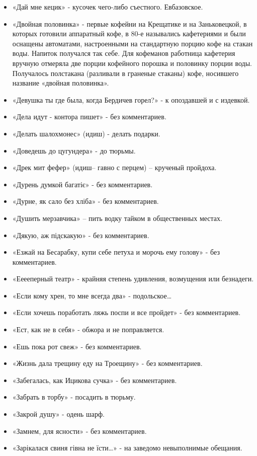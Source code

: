 \begin{itemize}
\item  «Дай мне кецик» - кусочек чего-либо съестного. Евбазовское.
\item  «Двойная половинка» - первые кофейни на Крещатике и на Заньковецкой, в которых готовили аппаратный кофе, в 80-е назывались кафетериями и были оснащены автоматами, настроенными на стандартную порцию кофе на стакан воды. Напиток получался так себе. Для кофеманов работница кафетерия вручную отмеряла две порции кофейного порошка и половинку порции воды. Получалось полстакана (разливали в граненые стаканы) кофе, носившего название «двойная половинка».
\item  «Девушка ты где была, когда Бердичев горел?» - к опоздавшей и с издевкой.
\item  «Дела идут - контора пишет» - без комментариев.
\item  «Делать шалохмонес» (идиш) - делать подарки.
\item  «Доведешь до цугундера» - до тюрьмы.
\item  «Дрек мит фефер» (идиш– гавно с перцем) – крученый пройдоха. 
\item  «Дурень думкой багатіє» - без комментариев.
\item  «Дурне, як сало без хліба» - без комментариев.
\item  «Душить мерзавчика» – пить водку тайком в общественных местах.
\item  «Дякую, аж підскакую» - без комментариев.
\item  «Езжай на Бесарабку, купи себе петуха и морочь ему голову» - без комментариев.
\item  «Ееееперный театр» - крайняя степень удивления, возмущения или безнадеги.
\item  «Если кому хрен, то мне всегда два» - подольское…
\item  «Если хочешь поработать ляжь поспи и все пройдет» - без комментариев.
\item  «Ест, как не в себя» - обжора и не поправляется.
\item  «Ешь пока рот свеж» - без комментариев.
\item  «Жизнь дала трещину еду на Троещину» - без комментариев.
\item  «Забегалась, как Ицикова сучка» - без комментариев.
\item  «Забрать в торбу» -  посадить в тюрьму.
\item  «Закрой душу» - одень шарф.
\item  «Замнем, для ясности» - без комментариев.
\item  «Зарікалася свиня гівна не їсти…» - на заведомо невыполнимые обещания.

\end{itemize}
